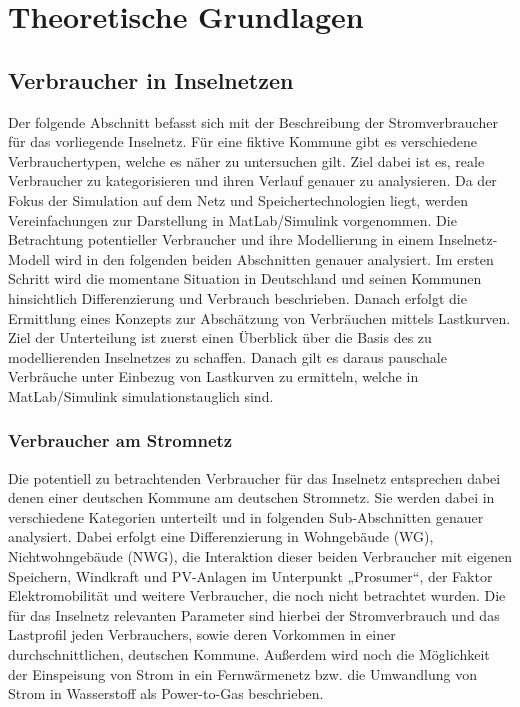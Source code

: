 \chapter{Theoretische Grundlagen}

\section{Verbraucher in Inselnetzen}

Der folgende Abschnitt befasst sich mit der Beschreibung der Stromverbraucher für das vorliegende Inselnetz. 
Für eine fiktive Kommune gibt es verschiedene Verbrauchertypen, welche es näher zu untersuchen gilt. 
Ziel dabei ist es, reale Verbraucher zu kategorisieren und ihren Verlauf genauer zu analysieren. 
Da der Fokus der Simulation auf dem Netz und Speichertechnologien liegt, werden Vereinfachungen zur Darstellung in MatLab/Simulink vorgenommen.
Die Betrachtung potentieller Verbraucher und ihre Modellierung in einem Inselnetz-Modell wird in den folgenden beiden Abschnitten genauer analysiert. 
Im ersten Schritt wird die momentane Situation in Deutschland und seinen Kommunen hinsichtlich Differenzierung und Verbrauch beschrieben. 
Danach erfolgt die Ermittlung eines Konzepts zur Abschätzung von Verbräuchen mittels Lastkurven. 
Ziel der Unterteilung ist zuerst einen Überblick über die Basis des zu modellierenden Inselnetzes zu schaffen. 
Danach gilt es daraus pauschale Verbräuche unter Einbezug von Lastkurven zu ermitteln, welche in MatLab/Simulink simulationstauglich sind.

\subsection{Verbraucher am Stromnetz}

Die potentiell zu betrachtenden Verbraucher für das Inselnetz entsprechen dabei denen einer deutschen Kommune am deutschen Stromnetz. 
Sie werden dabei in verschiedene Kategorien unterteilt und in folgenden Sub-Abschnitten genauer analysiert. 
Dabei erfolgt eine Differenzierung in Wohngebäude (WG), Nichtwohngebäude (NWG), die Interaktion dieser beiden Verbraucher mit eigenen Speichern, Windkraft und PV-Anlagen im Unterpunkt „Prosumer“, der Faktor Elektromobilität und weitere Verbraucher, die noch nicht betrachtet wurden. 
Die für das Inselnetz relevanten Parameter sind hierbei der Stromverbrauch und das Lastprofil jeden Verbrauchers, sowie deren Vorkommen in einer durchschnittlichen, deutschen Kommune. 
Außerdem wird noch die Möglichkeit der Einspeisung von Strom in ein Fernwärmenetz bzw. die Umwandlung von Strom in Wasserstoff als Power-to-Gas beschrieben.

